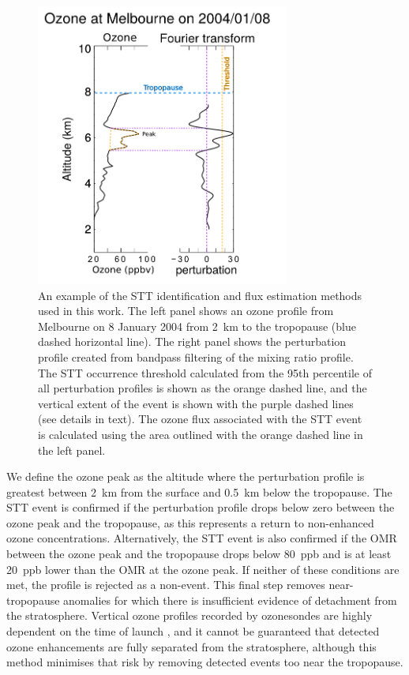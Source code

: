    \begin{figure}[t]
      \includegraphics[width=8.3cm]{Figures/Ozone/filtereg.png}
      \caption{ %
        An example of the STT identification and flux estimation methods used in this work. 
        The left panel shows an ozone profile from Melbourne on 8 January 2004 from 2~km to the tropopause (blue dashed horizontal line).
        The right panel shows the perturbation profile created from bandpass filtering of the mixing ratio profile. The STT occurrence threshold calculated from the 95th percentile of all perturbation profiles is shown as the orange dashed line, and the vertical extent of the event is shown with the purple dashed lines (see details in text).
        The ozone flux associated with the STT event is calculated using the area outlined with the orange dashed line in the left panel.
      }
      \label{Ozone:fig:filterEG}
    \end{figure}
    
    We define the ozone peak as the altitude where the perturbation profile is greatest between 2~km from the surface and 0.5~km below the tropopause.
    The STT event is confirmed if the perturbation profile drops below zero between the ozone peak and the tropopause, as this represents a return to non-enhanced ozone concentrations.
    Alternatively, the STT event is also confirmed if the OMR between the ozone peak and the tropopause drops below 80~ppb and is at least 20~ppb lower than the OMR at the ozone peak. 
    If neither of these conditions are met, the profile is rejected as a non-event.
    This final step removes near-tropopause anomalies for which there is insufficient evidence of detachment from the stratosphere.
    Vertical ozone profiles recorded by ozonesondes are highly dependent on the time of launch \citep{Sprenger2003}, and it cannot be guaranteed that detected ozone enhancements are fully separated from the stratosphere, although this method minimises that risk by removing detected events too near the tropopause.
    
